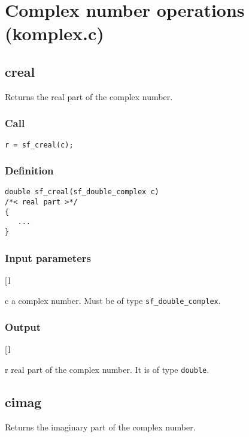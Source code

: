 \section{Complex number operations (komplex.c)}




\subsection{{creal}}
Returns the real part of the complex number.

\subsubsection*{Call}
\begin{verbatim}r = sf_creal(c);\end{verbatim}

\subsubsection*{Definition}
\begin{verbatim}
double sf_creal(sf_double_complex c)
/*< real part >*/
{
   ...
}
\end{verbatim}

\subsubsection*{Input parameters}
\begin{desclist}{\tt }{\quad}[\tt ]
   \setlength\itemsep{0pt}
   \item[c] a complex number. Must be of type \texttt{sf\_double\_complex}.  
\end{desclist}

\subsubsection*{Output}
\begin{desclist}{\tt }{\quad}[\tt ]
   \setlength\itemsep{0pt}
   \item[r] real part of the complex number. It is of type \texttt{double}.
\end{desclist}




\subsection{{cimag}}
Returns the imaginary part of the complex number.

